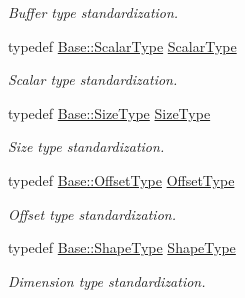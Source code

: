 \begin{DoxyCompactItemize}
\begin{DoxyCompactList}\small\item\em Buffer type standardization. \end{DoxyCompactList}\item 
typedef \hyperlink{classffnn_1_1layer_1_1internal_1_1_interface_a7f834e3365e5199bcbcd16d9abd63941}{Base\-::\-Scalar\-Type} \hyperlink{classffnn_1_1layer_1_1_layer_acec0144b094cc88faf0771b7ca8ce54c}{Scalar\-Type}
\begin{DoxyCompactList}\small\item\em Scalar type standardization. \end{DoxyCompactList}\item 
typedef \hyperlink{classffnn_1_1layer_1_1internal_1_1_interface_af0567642f60c65b5e87067226a54174b}{Base\-::\-Size\-Type} \hyperlink{classffnn_1_1layer_1_1_layer_a109e7a20f18d04e6d6f029c816b0958a}{Size\-Type}
\begin{DoxyCompactList}\small\item\em Size type standardization. \end{DoxyCompactList}\item 
typedef \hyperlink{classffnn_1_1layer_1_1internal_1_1_interface_adc5bb454329ebd51ac26579a43c006fd}{Base\-::\-Offset\-Type} \hyperlink{classffnn_1_1layer_1_1_layer_a5ed88ceefa1814e88fbccfdded6c9999}{Offset\-Type}
\begin{DoxyCompactList}\small\item\em Offset type standardization. \end{DoxyCompactList}\item 
typedef \hyperlink{classffnn_1_1layer_1_1internal_1_1_interface_a945709b1d0ea54a51539b80d04485f5f}{Base\-::\-Shape\-Type} \hyperlink{classffnn_1_1layer_1_1_layer_a83bc836aeacb312f6507ce1b47f8f7eb}{Shape\-Type}
\begin{DoxyCompactList}\small\item\em Dimension type standardization. \end{DoxyCompactList}\end{DoxyCompactItemize}
